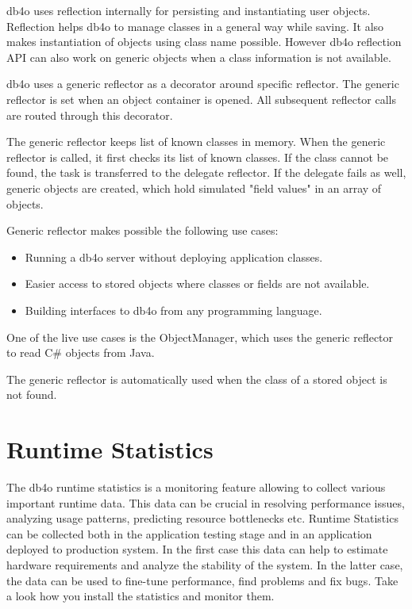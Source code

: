 db4o uses reflection internally for persisting and instantiating user objects. Reflection helps db4o to manage classes in a general way while saving. It also makes instantiation of objects using class name possible. However db4o reflection API can also work on generic objects when a class information is not available.

db4o uses a generic reflector as a decorator around specific reflector. The generic reflector is set when an object container is opened. All subsequent reflector calls are routed through this decorator.

The generic reflector keeps list of known classes in memory. When the generic reflector is called, it first checks its list of known classes. If the class cannot be found, the task is transferred to the delegate reflector. If the delegate fails as well, generic objects are created, which hold simulated "field values" in an array of objects.

Generic reflector makes possible the following use cases:

\begin{itemize}
\item Running a db4o server without deploying application classes.
\item Easier access to stored objects where classes or fields are not available.
\item Building interfaces to db4o from any programming language.
\end{itemize}

One of the live use cases is the ObjectManager, which uses the generic reflector to read C\# objects from Java.

The generic reflector is automatically used when the class of a stored object is not found.

\section{Runtime Statistics}
\label{ref:advanced-topics-runtime-statistics}

The db4o runtime statistics is a monitoring feature allowing to collect various important runtime data. This data can be crucial in resolving performance issues, analyzing usage patterns, predicting resource bottlenecks etc. Runtime Statistics can be collected both in the application testing stage and in an application deployed to production system. In the first case this data can help to estimate hardware requirements and analyze the stability of the system. In the latter case, the data can be used to fine-tune performance, find problems and fix bugs. Take a look how you install the statistics and monitor them.

